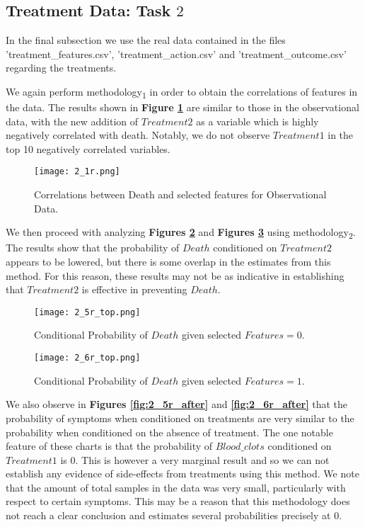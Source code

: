 \subsection{Treatment Data: Task $2$}
\graphicspath{{pictures/task2/}}
In the final subsection we use the real data contained in the files 'treatment\_features.csv', 'treatment\_action.csv' and 'treatment\_outcome.csv' regarding the treatments. 

We again perform methodology\textsubscript{1} in order to obtain the correlations of features in the data. The results shown in \textbf{Figure \ref{fig:2_1r}} are similar to those in the observational data, with the new addition of $Treatment2$ as a variable which is highly negatively correlated with death. Notably, we do not observe $Treatment1$ in the top 10 negatively correlated variables.

\begin{figure}[H]
  \texttt{[image: 2\_1r.png]}
  \caption{Correlations between Death and selected features for Observational Data.}
    \label{fig:2_1r}
\end{figure}


We then proceed with analyzing \textbf{Figures \ref{fig:2_5r_top}} and \textbf{Figures \ref{fig:2_6r_top}} using methodology\textsubscript{2}. The results show that the probability of $Death$ conditioned on $Treatment2$ appears to be lowered, but there is some overlap in the estimates from this method. For this reason, these results may not be as indicative in establishing that $Treatment2$ is effective in preventing $Death$. 

\begin{figure}[H]
  \texttt{[image: 2\_5r\_top.png]}
  \caption{Conditional Probability of $Death$ given selected $Features = 0$.}
    \label{fig:2_5r_top}
\end{figure}
\begin{figure}[H]
  \texttt{[image: 2\_6r\_top.png]}
  \caption{Conditional Probability of $Death$ given selected $Features = 1$.}
    \label{fig:2_6r_top}
\end{figure}

We also observe in \textbf{Figures \ref{fig:2_5r_after}} and \textbf{\ref{fig:2_6r_after}} that the probability of symptoms when conditioned on treatments are very similar to the probability when conditioned on the absence of treatment. The one notable feature of these charts is that the probability of $Blood\_clots$ conditioned on $Treatment 1$ is $0$. This is however a very marginal result and so we can not establish any evidence of side-effects from treatments using this method. We note that the amount of total samples in the data was very small, particularly with respect to certain symptoms. This may be a reason that this methodology does not reach a clear conclusion and estimates several probabilities precisely at $0$.

